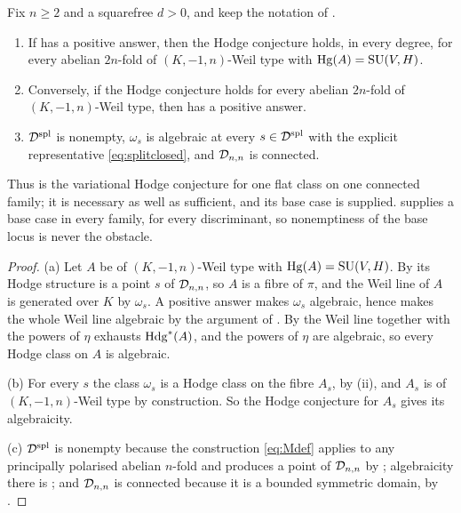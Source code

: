 \begin{theorem}\label{thm:residual}
Fix $n\ge2$ and a squarefree $d>0$, and keep the notation of
.
\begin{enumerate}[label=\textup{(\alph*)},nosep]
\item If  has a positive answer, then the Hodge conjecture
  holds, in every degree, for every abelian $2n$-fold of $(K,-1,n)$-Weil type
  with $\operatorname{Hg}(A)=\operatorname{SU}(V,H)$.
\item Conversely, if the Hodge conjecture holds for every abelian $2n$-fold of
  $(K,-1,n)$-Weil type, then  has a positive answer.
\item $\mathcal{D}^{\mathrm{spl}}$ is nonempty, $\omega_{s}$ is algebraic at every
  $s\in\mathcal{D}^{\mathrm{spl}}$ with the explicit representative
  \eqref{eq:splitclosed}, and $\mathcal{D}_{n,n}$ is connected.
\end{enumerate}
Thus  is the variational Hodge conjecture for one flat class
on one connected family; it is necessary as well as sufficient, and its base
case is supplied.  supplies a base case in every family,
for every discriminant, so nonemptiness of the base locus is never the
obstacle.
\end{theorem}

\begin{proof}
(a) Let $A$ be of $(K,-1,n)$-Weil type with $\operatorname{Hg}(A)=\operatorname{SU}(V,H)$. By
 its Hodge structure is a point $s$ of $\mathcal{D}_{n,n}$, so
$A$ is a fibre of $\pi$, and the Weil line of $A$ is generated over $K$ by
$\omega_{s}$. A positive answer makes $\omega_{s}$ algebraic, hence makes the
whole Weil line algebraic by the argument of . By
 the Weil line together with the powers of $\eta$ exhausts
$\mathrm{Hdg}^{*}(A)$, and the powers of $\eta$ are algebraic, so every Hodge class on
$A$ is algebraic.

(b) For every $s$ the class $\omega_{s}$ is a Hodge class on the fibre $A_{s}$,
by (ii), and $A_{s}$ is of $(K,-1,n)$-Weil type by
construction. So the Hodge conjecture for $A_{s}$ gives its algebraicity.

(c) $\mathcal{D}^{\mathrm{spl}}$ is nonempty because the construction \eqref{eq:Mdef}
applies to any principally polarised abelian $n$-fold and produces a point of
$\mathcal{D}_{n,n}$ by ; algebraicity there is
; and $\mathcal{D}_{n,n}$ is connected because it is a
bounded symmetric domain, by .
\end{proof}


